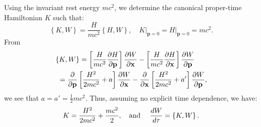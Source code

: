 \documentclass[11pt, reqno]{amsart}
\newcommand{\beqn}{\begin{eqnarray}}
\newcommand{\eeqn}{\end{eqnarray}}
\newcommand{\lb}{\label}
\numberwithin{equation}{section}
\begin{document}
Using the invariant rest energy $mc^2$, we determine the canonical proper-time Hamiltonian $K$ such that:
\[
\left\{ {K,W} \right\} = \frac{H}{{mc^2 }}\left\{ {H,W} \right\},\quad \left. K \right|_{{\mathbf{p}} = 0}  = \left. H \right|_{{\mathbf{p}} = 0}  = mc^2. 
\]
From 
\[
\begin{gathered} 
  \left\{ {K,W} \right\} = \left[ {\frac{H}{{mc^2 }}\frac{{\partial H}}{{\partial {\mathbf{p}}}}} \right]\frac{{\partial W}}{{\partial {\mathbf{x}}}} - \left[ {\frac{H}
{{mc^2 }}\frac{{\partial H}}{{\partial {\mathbf{x}}}}} \right]\frac{{\partial W}}
{{\partial {\mathbf{p}}}} \hfill \\
  {\text{          }} = \frac{\partial }{{\partial {\mathbf{p}}}}\left[ {\frac{{H^2 }}
{{2mc^2 }} + a} \right]\frac{{\partial W}}{{\partial {\mathbf{x}}}} - \frac{\partial }
{{\partial {\mathbf{x}}}}\left[ {\frac{{H^2 }}{{2mc^2 }} + a'} \right]\frac{{\partial W}}
{{\partial {\mathbf{p}}}}, \hfill \\ 
\end{gathered} 
\]
we see that $a = a' = \tfrac{1}{2}mc^2$.  Thus, assuming no explicit time dependence, we have:
\beqn{\lb{2.4}}
K = \frac{{H^2 }}{{2mc^2 }} + \frac{{mc^2 }}{2},\quad {\text{and }}\quad \frac{{dW}}
{{d\tau }} = \left\{ {K,W} \right\}.
\eeqn 
\end{document}
